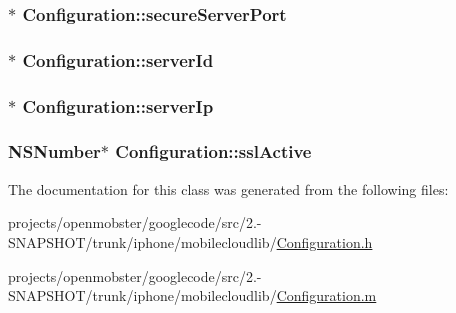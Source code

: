 \label{interface_configuration_a8c8d5a663a660ea7f8f330b918136190}
\hypertarget{interface_configuration_a9f6c8951287d30dbdbf11ebf35164cc7}{
\subsubsection[{secure\-Server\-Port}]{$\ast$ \-Configuration\-::secure\-Server\-Port}}
\label{interface_configuration_a9f6c8951287d30dbdbf11ebf35164cc7}
\hypertarget{interface_configuration_ad0ebc152d01a04f7614a99bd21a5ff30}{
\subsubsection[{server\-Id}]{$\ast$ \-Configuration\-::server\-Id}}
\label{interface_configuration_ad0ebc152d01a04f7614a99bd21a5ff30}
\hypertarget{interface_configuration_a55deb1b66cb33d0b1496856317859f09}{
\subsubsection[{server\-Ip}]{$\ast$ \-Configuration\-::server\-Ip}}
\label{interface_configuration_a55deb1b66cb33d0b1496856317859f09}
\hypertarget{interface_configuration_a13631f1d7b87922819aaaf457aa004b5}{
\subsubsection[{ssl\-Active}]{\setlength{\rightskip}{0pt plus 5cm}\-N\-S\-Number$\ast$ \-Configuration\-::ssl\-Active}}
\label{interface_configuration_a13631f1d7b87922819aaaf457aa004b5}


\-The documentation for this class was generated from the following files\-:\begin{DoxyCompactItemize}
\item 
projects/openmobster/googlecode/src/2.-\/\-S\-N\-A\-P\-S\-H\-O\-T/trunk/iphone/mobilecloudlib/\hyperlink{_configuration_8h}{\-Configuration.\-h}\item 
projects/openmobster/googlecode/src/2.-\/\-S\-N\-A\-P\-S\-H\-O\-T/trunk/iphone/mobilecloudlib/\hyperlink{_configuration_8m}{\-Configuration.\-m}\end{DoxyCompactItemize}
